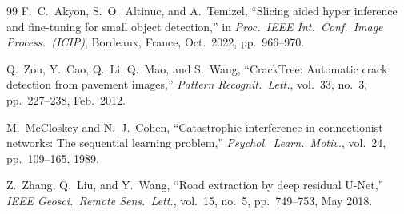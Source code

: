 \documentclass[12pt,a4paper]{article}
\begin{document}
\begin{thebibliography}{99}
F.~C.~Akyon, S.~O.~Altinuc, and A.~Temizel,
``Slicing aided hyper inference and fine-tuning for small object detection,''
in \textit{Proc.\ IEEE Int.\ Conf.\ Image Process.\ (ICIP)},
Bordeaux, France, Oct.\ 2022, pp.\ 966--970.

Q.~Zou, Y.~Cao, Q.~Li, Q.~Mao, and S.~Wang,
``CrackTree: Automatic crack detection from pavement images,''
\textit{Pattern Recognit.\ Lett.},
vol.\ 33, no.\ 3, pp.\ 227--238, Feb.\ 2012.

M.~McCloskey and N.~J.~Cohen,
``Catastrophic interference in connectionist networks: The sequential learning problem,''
\textit{Psychol.\ Learn.\ Motiv.},
vol.\ 24, pp.\ 109--165, 1989.

Z.~Zhang, Q.~Liu, and Y.~Wang,
``Road extraction by deep residual U-Net,''
\textit{IEEE Geosci.\ Remote Sens.\ Lett.},
vol.\ 15, no.\ 5, pp.\ 749--753, May 2018.

\end{thebibliography}
\end{document}
